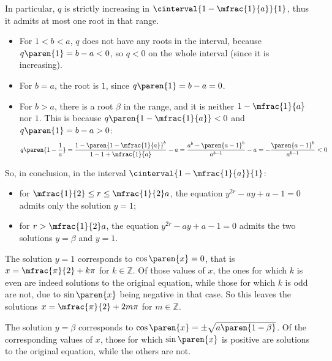 In particular, $q$ is strictly increasing in $\cinterval{1 - \mfrac{1}{a}}{1}$,
thus it admits at most one root in that range.
\begin{itemize}
  \item For $1 < b < a$,
        $q$ does not have any roots in the interval,
        because $q\paren{1} = b - a < 0$,
        so $q < 0$ on the whole interval (since it is increasing).
  \item For $b = a$,
        the root is $1$, since $q\paren{1} = b - a = 0$.
  \item For $b > a$,
        there is a root $\beta$ in the range,
        and it is neither $1 - \mfrac{1}{a}$ nor $1$.
        This is because $q\paren{1 - \mfrac{1}{a}} < 0$ and $q\paren{1} = b - a > 0$:
        \begin{equation*}
          q\paren{1 - \frac{1}{a}} =
          \frac{1 - \paren{1 - \mfrac{1}{a}}^b}{1 - 1 + \mfrac{1}{a}} - a =
          \frac{a^b - \paren{a - 1}^b}{a^{b-1}} - a =
          - \frac{\paren{a - 1}^b}{a^{b-1}} < 0
        \end{equation*}
\end{itemize}

So, in conclusion, in the interval $\cinterval{1 - \mfrac{1}{a}}{1}$:
\begin{itemize}
  \item for $\mfrac{1}{2} \leq r \leq \mfrac{1}{2} a$,
        the equation $y^{2 r} - a y + a - 1 = 0$
        admits only the solution $y = 1$;
  \item for $r > \mfrac{1}{2} a$,
        the equation $y^{2 r} - a y + a - 1 = 0$
        admits the two solutions $y = \beta$ and $y = 1$.
\end{itemize}

The solution $y = 1$ corresponds to $\cos\paren{x} = 0$,
that is $x = \mfrac{\pi}{2} + k \pi$ for $k \in \mathbb{Z}$.
Of those values of $x$,
the ones for which $k$ is even are indeed solutions to the original equation,
while those for which $k$ is odd are not, due to $\sin\paren{x}$ being negative in that case.
So this leaves the solutions
$x = \mfrac{\pi}{2} + 2 m \pi$ for $m \in \mathbb{Z}$.

The solution $y = \beta$ corresponds to $\cos\paren{x} = \pm \sqrt{a \paren{1 - \beta}}$.
Of the corresponding values of $x$, those for which $\sin\paren{x}$ is positive are solutions to the original equation,
while the others are not.
